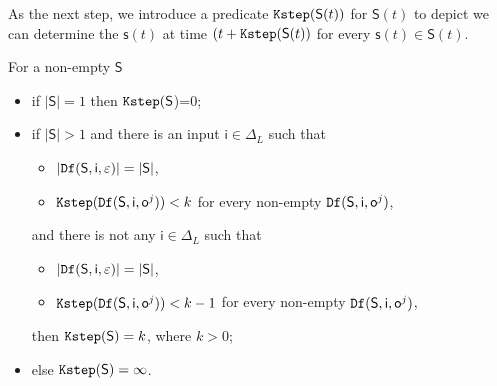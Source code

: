 As the next step, we introduce a predicate ${\tt Kstep}(\mathsf{S}(t))$ for $\mathsf{S}(t)$ to depict we can determine the $\mathsf{s}(t)$ at time $(t+{\tt Kstep}(\mathsf{S}(t))$ for every $\mathsf{s}(t)\in \mathsf{S}(t)$. 
\begin{definition}[$\Ks(\mathsf{S})$] 
For a non-empty $\mathsf{S}$
 \begin{itemize}
 \item   if $|\mathsf{S}|=1$ then ${\tt Kstep}(\mathsf{S}$)=0;
 \item  if $|\mathsf{S}|>1$ and there is an input $\mathsf{i} \in \Delta_L$ such that %
 \begin{itemize}
 \item  $|{\tt Df}(\mathsf{S},\mathsf{i},\varepsilon)|=|\mathsf{S}|$,
 \item  ${\tt Kstep}({\tt Df}(\mathsf{S},\mathsf{i},\mathsf{o}^{j}))< k$ for every non-empty ${\tt Df}(\mathsf{S},\mathsf{i},\mathsf{o}^{j})$,
 \end{itemize} 
 and there is not any $\mathsf{i} \in \Delta_L$ such that
  \begin{itemize}
 \item  $|{\tt Df}(\mathsf{S},\mathsf{i},\varepsilon)|=|\mathsf{S}|$,
 \item  ${\tt Kstep}({\tt Df}(\mathsf{S},\mathsf{i},\mathsf{o}^{j}))< k-1$ for every non-empty ${\tt Df}(\mathsf{S},\mathsf{i},\mathsf{o}^{j})$,
 \end{itemize} 
then ${\tt Kstep}(\mathsf{S})=k$, where $k >0$;%
 \item else ${\tt Kstep}(\mathsf{S})=\infty$.
 \end{itemize}
\end{definition}

